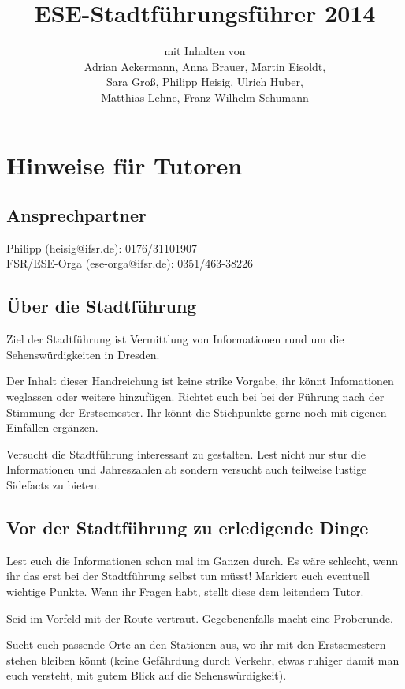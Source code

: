 \documentclass[a4paper,12pt]{report}
\begin{document}
\title{\textbf{ESE-Stadtführungsführer 2014}\\}
\date{}
\author{mit Inhalten von\\Adrian Ackermann, Anna Brauer, Martin Eisoldt,\\Sara Groß, Philipp Heisig, Ulrich Huber,\\ Matthias Lehne, Franz-Wilhelm Schumann}
\maketitle

\chapter{Hinweise für Tutoren}
\section{Ansprechpartner}
Philipp (heisig@ifsr.de): 0176/31101907\\
FSR/ESE-Orga (ese-orga@ifsr.de): 0351/463-38226


\section{Über die Stadtführung}
\begin{itemize*}
\item Ziel der Stadtführung ist Vermittlung von Informationen rund um die Sehenswürdigkeiten in Dresden.
\item Der Inhalt dieser Handreichung ist keine strike Vorgabe, ihr könnt Infomationen weglassen oder weitere hinzufügen.
Richtet euch bei bei der Führung nach der Stimmung der Erstsemester.
Ihr könnt die Stichpunkte gerne noch mit eigenen Einfällen ergänzen.
\item Versucht die Stadtführung interessant zu gestalten. Lest nicht nur stur die Informationen und Jahreszahlen ab sondern versucht auch teilweise lustige Sidefacts zu bieten.
\end{itemize*}

\section{Vor der Stadtführung zu erledigende Dinge}
\begin{itemize*}
\item Lest euch die Informationen schon mal im Ganzen durch.
Es wäre schlecht, wenn ihr das erst bei der Stadtführung selbst tun müsst!
Markiert euch eventuell wichtige Punkte.
Wenn ihr Fragen habt, stellt diese dem leitendem Tutor.
\item Seid im Vorfeld mit der Route vertraut. Gegebenenfalls macht eine Proberunde.
\item Sucht euch passende Orte an den Stationen aus, wo ihr mit den Erstsemestern stehen bleiben könnt (keine Gefährdung durch Verkehr, etwas ruhiger damit man euch versteht, mit gutem Blick auf die Sehenswürdigkeit).
\end{itemize*}
\end{document}
